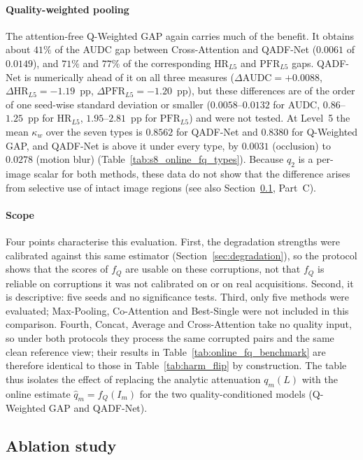 \documentclass[final,5p,times,twocolumn,authoryear]{elsarticle}
\newcommand{\qadfnet}{QADF-Net}
\theoremstyle{plain}
\theoremstyle{remark}
\begin{document}
\paragraph{Quality-weighted pooling} The attention-free Q-Weighted GAP again carries much of the benefit. It obtains about $41\%$ of the AUDC gap between Cross-Attention and \qadfnet{} ($0.0061$ of $0.0149$), and $71\%$ and $77\%$ of the corresponding $\text{HR}_{L5}$ and $\text{PFR}_{L5}$ gaps. \qadfnet{} is numerically ahead of it on all three measures ($\Delta\text{AUDC}=+0.0088$, $\Delta\text{HR}_{L5}=-1.19$~pp, $\Delta\text{PFR}_{L5}=-1.20$~pp), but these differences are of the order of one seed-wise standard deviation or smaller ($0.0058$--$0.0132$ for AUDC, $0.86$--$1.25$~pp for $\text{HR}_{L5}$, $1.95$--$2.81$~pp for $\text{PFR}_{L5}$) and were not tested. At Level~5 the mean $\kappa_w$ over the seven types is $0.8562$ for \qadfnet{} and $0.8380$ for Q-Weighted GAP, and \qadfnet{} is above it under every type, by $0.0031$ (occlusion) to $0.0278$ (motion blur) (Table~\ref{tab:s8_online_fq_types}). Because $q_2$ is a per-image scalar for both methods, these data do not show that the difference arises from selective use of intact image regions (see also Section~\ref{sec:r_ablation}, Part~C).

\paragraph{Scope} Four points characterise this evaluation. First, the degradation strengths were calibrated against this same estimator (Section~\ref{sec:degradation}), so the protocol shows that the scores of $f_Q$ are usable on these corruptions, not that $f_Q$ is reliable on corruptions it was not calibrated on or on real acquisitions. Second, it is descriptive: five seeds and no significance tests. Third, only five methods were evaluated; Max-Pooling, Co-Attention and Best-Single were not included in this comparison. Fourth, Concat, Average and Cross-Attention take no quality input, so under both protocols they process the same corrupted pairs and the same clean reference view; their results in Table~\ref{tab:online_fq_benchmark} are therefore identical to those in Table~\ref{tab:harm_flip} by construction. The table thus isolates the effect of replacing the analytic attenuation $q_m(L)$ with the online estimate $\hat{q}_m = f_Q(I_m)$ for the two quality-conditioned models (Q-Weighted GAP and \qadfnet{}).

\subsection{Ablation study}
\label{sec:r_ablation}
\end{document}
